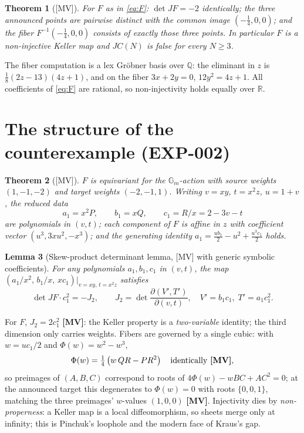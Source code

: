\documentclass[11pt]{article}
\newtheorem{theorem}{Theorem}[section]
\newtheorem{lemma}[theorem]{Lemma}
\theoremstyle{definition}
\theoremstyle{remark}
\newcommand{\Q}{\mathbb{Q}}
\newcommand{\Gm}{\mathbb{G}_m}
\newcommand{\detJ}{\det JF}
\begin{document}
\begin{theorem}[{[MV]}]\label{thm:valid}
For $F$ as in \eqref{eq:F}: $\detJ = -2$ identically; the three announced points are pairwise
distinct with the common image $(-\tfrac14, 0, 0)$; and the fiber
$F^{-1}(-\tfrac14, 0, 0)$ consists of exactly those three points. In particular $F$ is a
non-injective Keller map and $JC(N)$ is false for every $N \ge 3$.
\end{theorem}

The fiber computation is a lex Gr\"obner basis over $\Q$: the eliminant in $z$ is
$\tfrac18(2z - 13)(4z + 1)$, and on the fiber $3x + 2y = 0$, $12y^2 = 4z + 1$. All coefficients
of \eqref{eq:F} are rational, so non-injectivity holds equally over $\mathbb{R}$.

\section{The structure of the counterexample (EXP-002)}

\begin{theorem}[{[MV]}]\label{thm:structure}
$F$ is equivariant for the $\Gm$-action with source weights $(1, -1, -2)$ and target weights
$(-2, -1, 1)$. Writing $v = xy$, $t = x^2 z$, $u = 1 + v$, the reduced data
\[
a_1 = x^2 P, \qquad b_1 = x Q, \qquad c_1 = R / x = 2 - 3v - t
\]
are polynomials in $(v, t)$; each component of $F$ is affine in $z$ with coefficient vector
$(u^3, 3xu^2, -x^3)$; and the generating identity
$a_1 = \tfrac{u b_1}{2} - u^2 + \tfrac{u^3 c_1}{2}$ holds.
\end{theorem}

\begin{lemma}[Skew-product determinant lemma, {[MV]} with generic symbolic coefficients]
\label{lem:skew}
For \emph{any} polynomials $a_1, b_1, c_1$ in $(v, t)$, the map
$(a_1/x^2,\, b_1/x,\, x c_1)|_{v = xy,\, t = x^2 z}$ satisfies
\[
\detJ \cdot c_1^2 = -J_2, \qquad
J_2 = \det \frac{\partial (V', T')}{\partial (v, t)}, \quad V' = b_1 c_1, \; T' = a_1 c_1^2 .
\]
\end{lemma}

For $F$, $J_2 = 2 c_1^2$ \textbf{[MV]}: the Keller property is a \emph{two-variable} identity;
the third dimension only carries weights. Fibers are governed by a single cubic:
with $w = u c_1 / 2$ and $\Phi(w) = w^2 - w^3$,
\begin{equation}\label{eq:fiber}
\Phi(w) = \tfrac14\left(w\, QR - P R^2\right) \quad \text{identically \textbf{[MV]}},
\end{equation}
so preimages of $(A, B, C)$ correspond to roots of $4\Phi(w) - w BC + A C^2 = 0$; at the
announced target this degenerates to $\Phi(w) = 0$ with roots $\{0, 0, 1\}$, matching the three
preimages' $w$-values $(1, 0, 0)$ \textbf{[MV]}. Injectivity dies by \emph{non-properness}: a
Keller map is a local diffeomorphism, so sheets merge only at infinity; this is Pinchuk's
loophole and the modern face of Kraus's gap.
\end{document}
